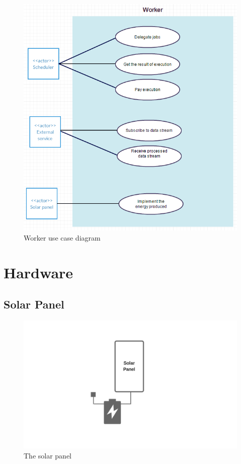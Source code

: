         \begin{figure}[!h]\centering
            \includegraphics[width=\columnwidth]{5-Design/figs/use-case-diagram.png}
            \caption{Worker use case diagram}
        \end{figure}

        \clearpage

\section{Hardware}

    \subsection{Solar Panel}

        \begin{figure}[!h]\centering
            \includegraphics[width=.6\columnwidth]{5-Design/figs/solar-panel.png}
            \caption{The solar panel}
        \end{figure}

